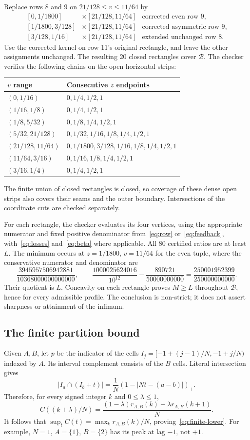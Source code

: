 \documentclass[10pt]{article}
\newcommand{\pos}[1]{(#1)_+}
\newcommand{\Bcal}{\mathcal B}
\begin{document}
Replace rows 8 and 9 on $21/128\leq v\leq11/64$ by
\[
\begin{array}{ccl}
{[0,1/1800]}&\times[21/128,11/64]&\text{corrected even row 9},\\
{[1/1800,3/128]}&\times[21/128,11/64]&\text{corrected asymmetric row 9},\\
{[3/128,1/16]}&\times[21/128,11/64]&\text{extended unchanged row 8}.
\end{array}
\]
Use the corrected kernel on row 11's original rectangle, and leave the other assignments unchanged.
The resulting 20 closed rectangles cover $\Bcal$. The checker verifies the following chains on the open horizontal strips:
\begin{center}\small
\begin{tabular}{ll}\toprule
$v$ range & Consecutive $z$ endpoints\\\midrule
$(0,1/16)$ & $0,1/4,1/2,1$\\
$(1/16,1/8)$ & $0,1/4,1/2,1$\\
$(1/8,5/32)$ & $0,1/8,1/4,1/2,1$\\
$(5/32,21/128)$ & $0,1/32,1/16,1/8,1/4,1/2,1$\\
$(21/128,11/64)$ & $0,1/1800,3/128,1/16,1/8,1/4,1/2,1$\\
$(11/64,3/16)$ & $0,1/16,1/8,1/4,1/2,1$\\
$(3/16,1/4)$ & $0,1/4,1/2,1$\\\bottomrule
\end{tabular}
\end{center}
The finite union of closed rectangles is closed, so coverage of these dense open strips also covers their seams and the outer boundary. Intersections of the coordinate cuts are checked separately.

For each rectangle, the checker evaluates its four vertices, using the appropriate numerator and fixed positive denominator from~\eqref{eq:row} or~\eqref{eq:feedback}, with~\eqref{eq:losses} and~\eqref{eq:beta} where applicable. All 80 certified ratios are at least $L$.
The minimum occurs at $z=1/1800$, $v=11/64$ for the even tuple, where the conservative numerator and denominator are
\[
\frac{3945957506942881}{10368000000000000},\qquad
\frac{1000025624016}{10^{12}}-\frac{890721}{50000000000}
=\frac{250001952399}{250000000000}.
\]
Their quotient is $L$. Concavity on each rectangle proves $M\geq L$ throughout $\Bcal$, hence for every admissible profile. The conclusion is non-strict; it does not assert sharpness or attainment of the infimum.

\subsection{The finite partition bound}
Given $A,B$, let $p$ be the indicator of the cells
$I_j=[-1+(j-1)/N,-1+j/N)$ indexed by $A$.
Its interval complement consists of the $B$ cells. Literal intersection gives
\[
|I_a\cap(I_b+t)|=\frac1N\pos{1-|Nt-(a-b)|}.
\]
Therefore, for every signed integer $k$ and $0\leq\lambda\leq1$,
\[
C((k+\lambda)/N)=\frac{(1-\lambda)r_{A,B}(k)+\lambda r_{A,B}(k+1)}N.
\]
It follows that $\sup_t C(t)=\max_k r_{A,B}(k)/N$, proving~\eqref{eq:finite-lower}.
For example, $N=1$, $A=\{1\}$, $B=\{2\}$ has its peak at lag $-1$, not $+1$.
\end{document}
